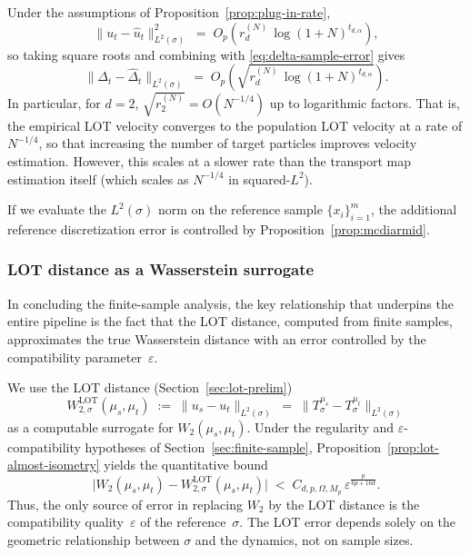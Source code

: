 \documentclass[11pt]{article}
\newcommand{\1}{\mathbf{1}}
\begin{document}
Under the assumptions of Proposition~\ref{prop:plug-in-rate},
\[
  \|u_t-\hat u_t\|_{L^2(\sigma)}^2
  \;=\; O_p\!\left(r_d^{(N)}\,\log(1+N)^{t_{d,\alpha}}\right),
\]
so taking square roots and combining with \eqref{eq:delta-sample-error} gives
\begin{equation}\label{eq:delta-sample-rate}
  \|\Delta_t-\hat\Delta_t\|_{L^2(\sigma)}
  \;=\;
  O_p\!\left(\sqrt{r_d^{(N)}\,\log(1+N)^{t_{d,\alpha}}}\right).
\end{equation}
In particular, for $d=2$, $\sqrt{r_2^{(N)}}=O(N^{-1/4})$ up to logarithmic factors. That is, the empirical LOT velocity converges to the population LOT velocity at a rate of $N^{-1/4}$, so that increasing the number of target particles improves velocity estimation. However, this scales at a slower rate than the transport map estimation itself (which scales as $N^{-1/4}$ in squared-$L^2$). 

If we evaluate the $L^2(\sigma)$ norm on the reference sample $\{x_i\}_{i=1}^m$, the additional reference discretization error is controlled by Proposition~\ref{prop:mcdiarmid}.


\subsubsection{LOT distance as a Wasserstein surrogate}\label{sec:lot-surrogate}

In concluding the finite-sample analysis, the key relationship that underpins the entire pipeline is the fact that the LOT distance, computed from finite samples, approximates the true Wasserstein distance with an error controlled by the compatibility parameter~$\varepsilon$.

We use the LOT distance (Section~\ref{sec:lot-prelim})
\begin{equation}\label{eq:lot-surrogate-error}
  W_{2,\sigma}^{\mathrm{LOT}}(\mu_s,\mu_t)
  \;:=\; \|u_s-u_t\|_{L^2(\sigma)}
  \;=\; \|T_\sigma^{\mu_s}-T_\sigma^{\mu_t}\|_{L^2(\sigma)}
\end{equation}
as a computable surrogate for $W_2(\mu_s,\mu_t)$. Under the regularity and
$\varepsilon$-compatibility hypotheses of Section~\ref{sec:finite-sample},
Proposition~\ref{prop:lot-almost-isometry} yields the quantitative bound
\begin{equation}\label{eq:w2-vs-lot}
  \bigl|W_2(\mu_s,\mu_t)-W_{2,\sigma}^{\mathrm{LOT}}(\mu_s,\mu_t)\bigr|
  \;<\; C_{d,p,\Omega,M_p}\,\varepsilon^{\frac{p}{6p+16d}}.
\end{equation}
Thus, the only source of error in replacing $W_2$ by the LOT distance is
the compatibility quality~$\varepsilon$ of the reference~$\sigma$. The LOT error depends solely on the geometric relationship between $\sigma$ and the dynamics, not on sample sizes. \\
\end{document}
